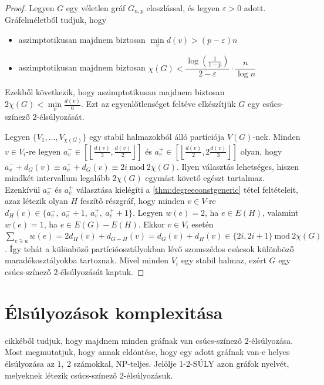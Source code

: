 \documentclass[12pt, a4paper]{report}
\theoremstyle{remark}
\theoremstyle{definition}
\begin{document}
\begin{proof}
Legyen $G$ egy véletlen gráf $G_{n,p}$ eloszlással, és legyen $\varepsilon > 0$ adott. Gráfelméletből tudjuk, hogy
\begin{itemize}
\item aszimptotikusan majdnem biztosan $\min\limits_v d(v) > (p - \varepsilon) n$
\item aszimptotikusan majdnem biztosan $\chi(G) < \dfrac{\log \left(\frac{1}{1 - p} \right)}{2 - \varepsilon} \cdot \dfrac{n}{\log n}$
\end{itemize}
Ezekből következik, hogy aszimptotikusan majdnem biztosan $2\chi(G) < \min\limits_v \frac{d(v)}{6}$. Ezt az egyenlőtlenséget feltéve elkészítjük $G$ egy csúcs-színező $2$-élsúlyozását.

Legyen $\lbrace V_1, \ldots, V_{\chi(G)} \rbrace$ egy stabil halmazokból álló partíciója $V(G)$-nek. Minden $v \in V_i$-re legyen $a_v^- \in \left\lbrack \left\lfloor \frac{d(v)}{3}, \frac{d(v)}{2} \right\rfloor \right\rbrack$ és $a_v^+ \in \left\lbrack \left\lfloor \frac{d(v)}{2}, 2\frac{d(v)}{3} \right\rfloor \right\rbrack$ olyan, hogy $a_v^- + d_G(v) \equiv a_v^+ + d_G(v) \equiv 2i\ \mathrm{mod}\ 2\chi(G)$. Ilyen választás lehetséges, hiszen mindkét intervallum legalább $2\chi(G)$ egymást követő egészt tartalmaz. Ezenkívül $a_v^-$ és $a_v^+$ választása kielégíti a \ref{thm:degreeconstgeneric} tétel feltételeit, azaz létezik olyan $H$ feszítő részgráf, hogy minden $v \in V$-re $d_H(v) \in \lbrace a_v^-,\ a_v^- + 1,\ a_v^+,\ a_v^+ + 1 \rbrace$. Legyen $w(e) = 2$, ha $e \in E(H)$, valamint $w(e) = 1$, ha $e \in E(G) - E(H)$. Ekkor $v \in V_i$ esetén $\sum\limits_{e \ni u} w(e) = 2d_H(v) + d_{G - H}(v) = d_G(v) + d_H(v) \in \lbrace 2i, 2i + 1 \rbrace\ \mathrm{mod}\ 2\chi(G)$. Így tehát a különböző partícióosztályokban lévő szomszédos csúcsok különböző maradékosztályokba tartoznak. Mivel minden $V_i$ egy stabil halmaz, ezért $G$ egy csúcs-színező $2$-élsúlyozását kaptuk.
\end{proof}

\chapter{Élsúlyozások komplexitása}
\citeauthor{AddarioBerry2008} \cite{AddarioBerry2008} cikkéből tudjuk, hogy majdnem minden gráfnak van csúcs-színező $2$-élsúlyozása. Most megmutatjuk, hogy annak eldöntése, hogy egy adott gráfnak van-e helyes élsúlyozása az $1,\ 2$ számokkal, NP-teljes. Jelölje 1-2-SÚLY azon gráfok nyelvét, melyeknek létezik csúcs-színező $2$-élsúlyozásuk.
\end{document}

